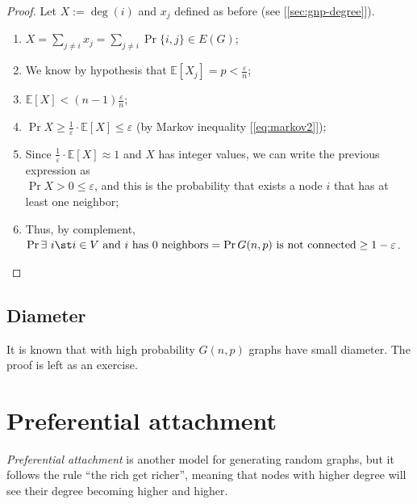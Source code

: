     \begin{proof}
        Let $X := \deg(i)$ and $x_j$ defined as before (see [\ref{sec:gnp-degree}]).
        \begin{enumerate}
            \item $X = \sum_{j \neq i} x_j = \sum_{j \neq i} \Pr{\{ i,j \} \in E(G)}$;
            \item We know by hypothesis that $\mathbb{E}[X_j] = p < \frac{\varepsilon}{n}$;
            \item $\mathbb{E}[X] < (n-1) \frac{\varepsilon}{n}$;
            \item $\Pr{X \geq \frac{1}{\varepsilon} \cdot \mathbb{E}[X]} \leq \varepsilon$ (by Markov inequality [\ref{eq:markov2}]);
            \item Since $\frac{1}{\varepsilon} \cdot \mathbb{E}[X] \approx 1$ and $X$ has integer values, we can write the previous expression as \\
            $\Pr{X > 0} \leq \varepsilon$, and this is the probability that exists a node $i$ that has at least one neighbor;
            \item Thus, by complement, $\Pr{\exists\ i \st i \in V \text{ and } i \text{ has 0 neighbors}} = \Pr{G(n,p) \text{ is not connected}} \geq 1 - \varepsilon$.
        \end{enumerate}
    \end{proof}
    

\subsection{Diameter}
    It is known that with high probability $G(n,p)$ graphs have small diameter. The proof is left as an exercise.

    
\section[Preferential attachment]{Preferential attachment\raisebox{.3\baselineskip}{\normalsize\footnotemark}}
\label{sec:pref-att}
    
    \textit{Preferential attachment} is another model for generating random graphs, but it follows the rule ``the rich get richer'', meaning that nodes with higher degree will see their degree becoming higher and higher.
    

